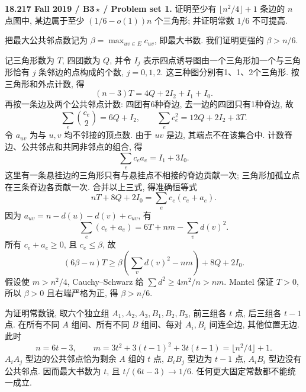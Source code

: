 \begin{exercise}\label{mit:18217-b3}
\textbf{18.217 Fall 2019 / B3\,$\star$ / Problem set 1.}
证明至少有 $\lfloor n^2/4\rfloor+1$ 条边的 $n$ 点图中, 某边属于至少 $(1/6-o(1))n$ 个三角形; 并证明常数 $1/6$ 不可提高.
\end{exercise}
\begin{solution}
把最大公共邻点数记为 $\beta=\max_{uv\in E}c_{uv}$, 即最大书数. 我们证明更强的 $\beta>n/6$.

记三角形数为 $T$, 四团数为 $Q$, 并令 $I_j$ 表示四点诱导图由一个三角形加一个与三角形恰有 $j$ 条邻边的点构成的个数, $j=0,1,2$. 这三种图分别有1、1、2个三角形. 按三角形和外点计数, 得
\[
(n-3)T=4Q+2I_2+I_1+I_0.
\]
再按一条边及两个公共邻点计数: 四团有6种脊边, 去一边的四团只有1种脊边, 故
\[
\sum_e\binom{c_e}{2}=6Q+I_2,
\qquad \sum_ec_e^2=12Q+2I_2+3T.
\]
令 $a_{uv}$ 为与 $u,v$ 均不邻接的顶点数. 由于 $uv$ 是边, 其端点不在该集合中. 计数脊边、公共邻点和共同非邻点的组合, 得
\[
\sum_ec_ea_e=I_1+3I_0.
\]
这里有一条悬挂边的三角形只有与悬挂点不相接的脊边贡献一次; 三角形加孤立点在三条脊边各贡献一次. 合并以上三式, 得准确恒等式
\[
nT+8Q+2I_0=\sum_ec_e(c_e+a_e).
\]
因为 $a_{uv}=n-d(u)-d(v)+c_{uv}$, 有
\[
\sum_e(c_e+a_e)=6T+nm-\sum_vd(v)^2.
\]
所有 $c_e+a_e\ge0$, 且 $c_e\le\beta$, 故
\[
(6\beta-n)T\ge\beta\left(\sum_vd(v)^2-nm\right)+8Q+2I_0.
\]
假设使 $m>n^2/4$, Cauchy--Schwarz 给 $\sum d^2\ge4m^2/n>nm$. Mantel 保证 $T>0$, 所以 $\beta>0$ 且右端严格为正, 得 $\beta>n/6$.

为证明常数锐, 取六个独立组 $A_1,A_2,A_3,B_1,B_2,B_3$, 前三组各 $t$ 点, 后三组各 $t-1$ 点. 在所有不同 $A$ 组间、所有不同 $B$ 组间、每对 $A_i,B_i$ 间连全边, 其他位置无边. 此时
\[
n=6t-3,\qquad m=3t^2+3(t-1)^2+3t(t-1)
=\lfloor n^2/4\rfloor+1.
\]
$A_iA_j$ 型边的公共邻点恰为剩余 $A$ 组的 $t$ 点, $B_iB_j$ 型边为 $t-1$ 点, $A_iB_i$ 型边没有公共邻点. 因而最大书数为 $t$, 且 $t/(6t-3)\to1/6$. 任何更大固定常数都不能统一成立.
\end{solution}

